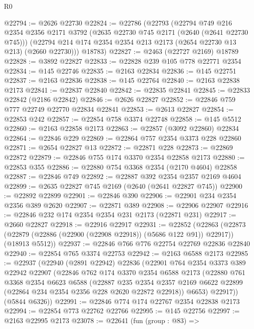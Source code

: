 \begin{lexlean}{R0}
\begin{coremodule}
@22794 := @2626 @22730
@22824 := @22786
    (@22793
      (@22794
        @749
        @216
        @2354
        @2356
        @2171
        @3792
        (@2635 @22730 @745 @2171 (@2640 (@2641 @22730 @745)))
        (@22794 @214 @174 @2354 @2354 @213 @2173 (@2654 @22730 @13 @213) (@2660 @22730)))
      @18783)
@22827 := @2463 (@22727 @2169) @18789
@22828 := @3892 @22827
@22833 := @22828 @239 @105 @778 @22771 @2354
@22834 := @145 @22746
@22835 := @2163 @22834
@22836 := @145 @22751
@22837 := @2163 @22836
@22838 := @145 @22764
@22840 := @2163 @22838 @2173
@22841 := @22837 @22840
@22842 := @22835 @22841
@22845 := @22833 @22842 (@2186 @22842)
@22846 := @2626 @22827
@22852 := @22846 @759 @777 @22749 @22770 @22834 @22841
@22853 := @2613 @22827
@22854 := @22853 @242
@22857 := @22854 @758 @3374 @22748
@22858 := @145 @5512
@22860 := @2163 @22858 @2173
@22863 := @22857 (@3092 @22860) @22834
@22864 := @22846 @229
@22869 := @22864 @757 @2354 @3373 @228 @22860
@22871 := @2654 @22827 @13
@22872 := @22871 @228
@22873 := @22869 @22872
@22879 := @22846 @755 @174 @3370 @2354 @22858 @2173
@22880 := @22853 @355
@22886 := @22880 @754 @3368 @2354 (@2170 @4604) @22858
@22887 := @22846 @749
@22892 := @22887 @392 @2354 @2357 @2169 @4604
@22899 := @2635 @22827 @745 @2169 (@2640 (@2641 @22827 @745))
@22900 := @22892 @22899
@22901 := @22846 @390
@22906 := @22901 @234 @2354 @2356 @389 @2620
@22907 := @22871 @389
@22908 := @22906 @22907
@22916 := @22846 @232 @174 @2354 @2354 @231 @2173 (@22871 @231)
@22917 := @2660 @22827
@22918 := @22916 @22917
@22931 := @22852
    (@22863
      (@22873 (@22879 (@22886 (@22900 (@22908 @22918)) (@5686 @122 @91)) @22917))
      (@18913 @5512))
@22937 := @22846 @766 @776 @22754 @22769 @22836 @22840
@22940 := @22854 @765 @3374 @22753
@22942 := @2163 @6588 @2173
@22985 := @22937
    (@22940
      (@2891 @22942)
      @22836
      (@22901
        @764
        @2354
        @3373
        @389
        @22942
        @22907
        (@22846
          @762
          @174
          @3370
          @2354
          @6588
          @2173
          (@22880
            @761
            @3368
            @2354
            @6623
            @6588
            (@22887
              @235
              @2354
              @2357
              @2169
              @6622
              @22899
              (@22864 @234 @2354 @2356 @228 @2620 @22872 @22918))
            @6653)
          @22917))
      (@5844 @6326))
@22991 := @22846 @774 @174 @22767 @2354 @22838 @2173
@22994 := @22854 @773 @22762 @22766
@22995 := @145 @22756
@22997 := @2163 @22995 @2173
@23078 := @22641
    (fun (group : @83) =>

\end{coremodule}
\end{lexlean}
